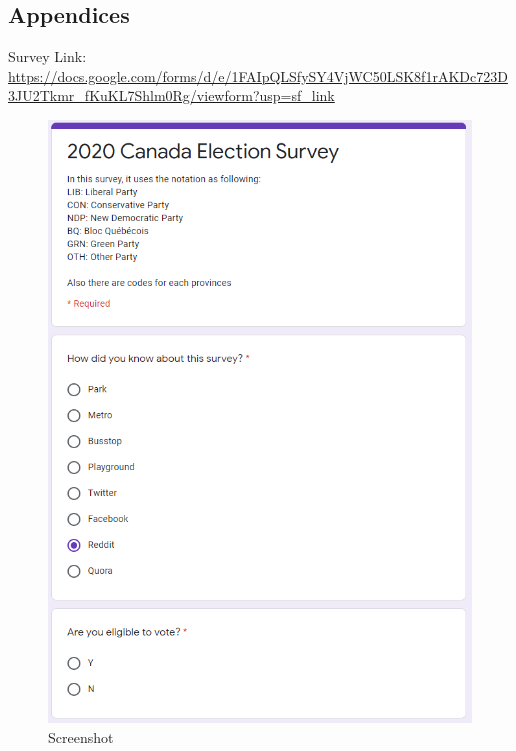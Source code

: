 \documentclass[
]{article}
\begin{document}
\hypertarget{appendices}{%
\subsection{Appendices}\label{appendices}}

Survey Link:
\url{https://docs.google.com/forms/d/e/1FAIpQLSfySY4VjWC50LSK8f1rAKDc723D3JU2Tkmr_fKuKL7Shlm0Rg/viewform?usp=sf_link}

\begin{figure}
\centering
\includegraphics{./screenshot.PNG}
\caption{Screenshot}
\end{figure}
\end{document}
